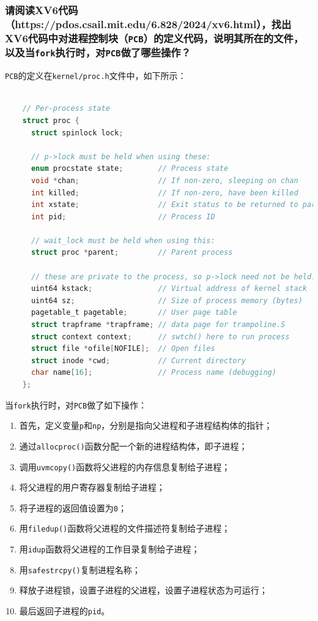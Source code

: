 \subsubsection{
    请阅读XV6代码（https://pdos.csail.mit.edu/6.828/2024/xv6.html），找出XV6代码中对进程控制块（{\tt PCB}）的定义代码，说明其所在的文件，以及当{\tt fork}执行时，对{\tt PCB}做了哪些操作？
}

\noindent
{\tt PCB}的定义在{\tt kernel/proc.h}文件中，如下所示：

\begin{lstlisting}[language=C, caption={{\tt PCB}定义}]

    // Per-process state
    struct proc {
      struct spinlock lock;

      // p->lock must be held when using these:
      enum procstate state;        // Process state
      void *chan;                  // If non-zero, sleeping on chan
      int killed;                  // If non-zero, have been killed
      int xstate;                  // Exit status to be returned to parent's wait
      int pid;                     // Process ID

      // wait_lock must be held when using this:
      struct proc *parent;         // Parent process

      // these are private to the process, so p->lock need not be held.
      uint64 kstack;               // Virtual address of kernel stack
      uint64 sz;                   // Size of process memory (bytes)
      pagetable_t pagetable;       // User page table
      struct trapframe *trapframe; // data page for trampoline.S
      struct context context;      // swtch() here to run process
      struct file *ofile[NOFILE];  // Open files
      struct inode *cwd;           // Current directory
      char name[16];               // Process name (debugging)
    };

\end{lstlisting}

\noindent
当{\tt fork}执行时，对{\tt PCB}做了如下操作：

\begin{enumerate}
    \item 首先，定义变量{\tt p}和{\tt np}，分别是指向父进程和子进程结构体的指针；
    \item 通过{\tt allocproc()}函数分配一个新的进程结构体，即子进程；
    \item 调用{\tt uvmcopy()}函数将父进程的内存信息复制给子进程；
    \item 将父进程的用户寄存器复制给子进程；
    \item 将子进程的返回值设置为{\tt 0}；
    \item 用{\tt filedup()}函数将父进程的文件描述符复制给子进程；
    \item 用{\tt idup}函数将父进程的工作目录复制给子进程；
    \item 用{\tt safestrcpy()}复制进程名称；
    \item 释放子进程锁，设置子进程的父进程，设置子进程状态为可运行；
    \item 最后返回子进程的{\tt pid}。
\end{enumerate}

